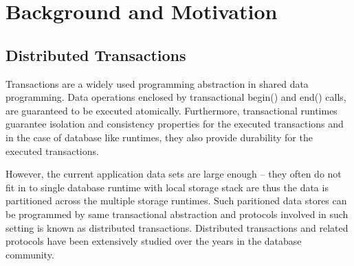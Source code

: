 \section{Background and Motivation}
\subsection{Distributed Transactions}
Transactions are a widely used programming abstraction in shared data programming.
Data operations enclosed by transactional begin() and end() calls, are guaranteed to be
executed atomically. Furthermore, transactional runtimes guarantee isolation and consistency
properties for the executed transactions and in the case of database like runtimes, they also
provide durability for the executed transactions.

However, the current application data sets are large enough -- they often do not fit in to
single database runtime with local storage stack are thus the data is partitioned across the
multiple storage runtimes. Such paritioned data stores can be programmed by same transactional 
abstraction and protocols involved in such setting is known as distributed transactions.
Distributed transactions and related protocols have been extensively studied over the years in the
database community.

